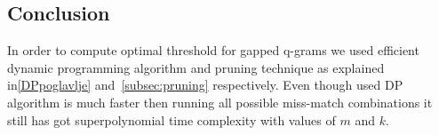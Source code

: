 \documentclass[paper=a4, fontsize=11pt]{scrartcl} %
\numberwithin{equation}{section} %
\numberwithin{figure}{section} %
\numberwithin{table}{section} %
\begin{document}

\subsection{Conclusion}

In order to compute optimal threshold for gapped q-grams we used efficient
dynamic programming algorithm and pruning technique as explained
in\ref{DPpoglavlje} and~\ref{subsec:pruning} respectively. Even though used DP
algorithm is much faster then running all possible miss-match combinations it
still has got superpolynomial time complexity with values of $m$ and $k$. 

\end{document}
